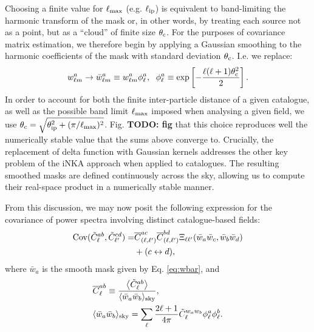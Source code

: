 \documentclass[aps,twocolumn, superscriptaddress, english, nofootinbib, 10pt]{revtex4-2}
\newcommand{\todo}[1]{{\color{blue}\bf TODO: #1}}
\begin{document}
    Choosing a finite value for $\ell_{\rm max}$ (e.g. $\ell_{\rm ip}$) is equivalent to band-limiting the harmonic transform of the mask or, in other words, by treating each source not as a point, but as a ``cloud'' of finite size $\theta_{\rm c}$. For the purposes of covariance matrix estimation, we therefore begin by applying a Gaussian smoothing to the harmonic coefficients of the mask with standard deviation $\theta_{\rm c}$. I.e. we replace:
    \begin{align}\label{eq:wbar}
      w^a_{\ell m}\rightarrow \bar{w}^a_{\ell m}\equiv w^a_{\ell m}\phi^a_\ell,\hspace{6pt}
      \phi^a_\ell\equiv\exp\left[-\frac{\ell(\ell+1)\theta_{\rm c}^2}{2}\right].
    \end{align}
    In order to account for both the finite inter-particle distance of a given catalogue, as well as the possible band limit $\ell_{\rm max}$ imposed when analysing a given field, we use $\theta_c=\sqrt{\theta_{\rm ip}^2+(\pi/\ell_{\rm max})^2}$. Fig. \todo{fig} that this choice reproduces well the numerically stable value that the sums above converge to. Crucially, the replacement of delta function with Gaussian kernels addresses the other key problem of the iNKA approach when applied to catalogues. The resulting smoothed masks are defined continuously across the sky, allowing us to compute their real-space product in a numerically stable manner.

    From this discussion, we may now posit the following expression for the covariance of power spectra involving distinct catalogue-based fields:
    \begin{align}\nonumber
      {\rm Cov}(\tilde{C}^{ab}_\ell,\tilde{C}^{cd}_{\ell'})=
      &\overline{C}^{ac}_{(\ell,\ell')}\overline{C}^{bd}_{(\ell,\ell')}\Xi_{\ell\ell'}(\bar{w}_a\bar{w}_c,\bar{w}_b\bar{w}_d)\\\label{eq:nka_catdiff}
      &+(c\leftrightarrow d),
    \end{align}
    where $\bar{w}_a$ is the smooth mask given by Eq. \ref{eq:wbar}, and
    \begin{align}\nonumber
      &\overline{C}^{ab}_\ell\equiv\frac{\left\langle\tilde{C}^{ab}_\ell\right\rangle}{\langle \bar{w}_a\bar{w}_b\rangle_{\rm sky}},\\
      &\langle\bar{w}_a\bar{w}_b\rangle_{\rm sky}=\sum_{\ell}\frac{2\ell+1}{4\pi}\tilde{C}^{w_aw_b}_\ell\phi^a_\ell\phi^b_\ell. \label{eq:inka_cell}
    \end{align}
\end{document}

